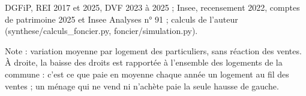 DGFiP, REI 2017 et 2025, DVF 2023 à 2025 ; Insee, recensement 2022, comptes de patrimoine 2025 et Insee Analyses n° 91 ; calculs de l'auteur (synthese/calculs\_foncier.py, foncier/simulation.py).\par Note : variation moyenne par logement des particuliers, sans réaction des ventes. À droite, la baisse des droits est rapportée à l'ensemble des logements de la commune : c'est ce que paie en moyenne chaque année un logement au fil des ventes ; un ménage qui ne vend ni n'achète paie la seule hausse de gauche.
